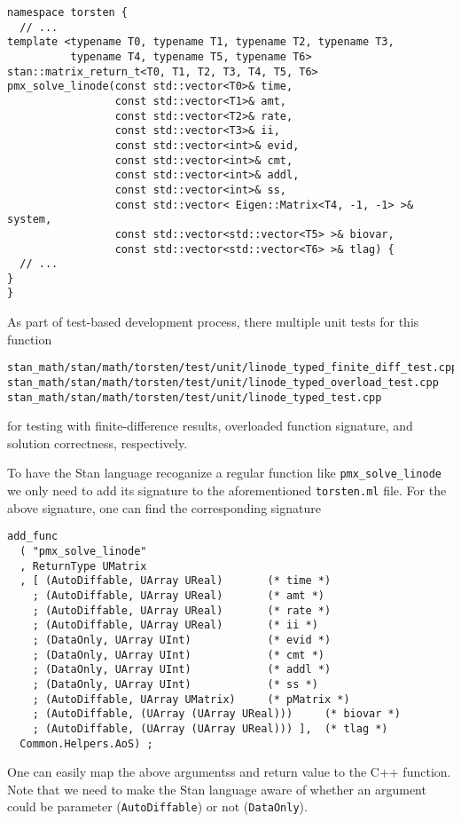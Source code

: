 \documentclass[12pt, reqno, oneside]{amsbook}
\numberwithin{equation}{chapter}
\numberwithin{figure}{chapter}
\numberwithin{table}{chapter}
\theoremstyle{remark}
\begin{document}
\begin{verbatim}
namespace torsten {
  // ...
template <typename T0, typename T1, typename T2, typename T3,
          typename T4, typename T5, typename T6>
stan::matrix_return_t<T0, T1, T2, T3, T4, T5, T6>
pmx_solve_linode(const std::vector<T0>& time,
                 const std::vector<T1>& amt,
                 const std::vector<T2>& rate,
                 const std::vector<T3>& ii,
                 const std::vector<int>& evid,
                 const std::vector<int>& cmt,
                 const std::vector<int>& addl,
                 const std::vector<int>& ss,
                 const std::vector< Eigen::Matrix<T4, -1, -1> >& system,
                 const std::vector<std::vector<T5> >& biovar,
                 const std::vector<std::vector<T6> >& tlag) {
  // ...
}
}
\end{verbatim}

As part of test-based development process, there multiple unit tests for this function
\begin{verbatim}
stan_math/stan/math/torsten/test/unit/linode_typed_finite_diff_test.cpp
stan_math/stan/math/torsten/test/unit/linode_typed_overload_test.cpp
stan_math/stan/math/torsten/test/unit/linode_typed_test.cpp
\end{verbatim}
for testing with finite-difference results, overloaded function
signature, and solution correctness, respectively.

To have the Stan language recoganize a regular function like
\texttt{pmx\_solve\_linode} we only need to add its signature to the
aforementioned \texttt{torsten.ml} file. For the above signature, one can
find the corresponding signature
\begin{verbatim}
add_func
  ( "pmx_solve_linode"
  , ReturnType UMatrix
  , [ (AutoDiffable, UArray UReal)       (* time *)
    ; (AutoDiffable, UArray UReal)       (* amt *)
    ; (AutoDiffable, UArray UReal)       (* rate *)
    ; (AutoDiffable, UArray UReal)       (* ii *)
    ; (DataOnly, UArray UInt)            (* evid *)
    ; (DataOnly, UArray UInt)            (* cmt *)
    ; (DataOnly, UArray UInt)            (* addl *)
    ; (DataOnly, UArray UInt)            (* ss *)
    ; (AutoDiffable, UArray UMatrix)     (* pMatrix *)
    ; (AutoDiffable, (UArray (UArray UReal)))     (* biovar *)
    ; (AutoDiffable, (UArray (UArray UReal))) ],  (* tlag *)
  Common.Helpers.AoS) ;
\end{verbatim}
One can easily map the above argumentss and return value to the C++
function. Note that we need to make the Stan language aware of whether
an argument could be parameter (\texttt{AutoDiffable}) or not (\texttt{DataOnly}). 
\end{document}
